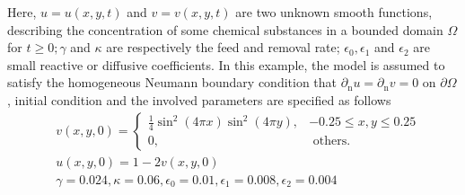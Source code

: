 Here, $u=u(x, y, t)$ and $v=v(x, y, t)$ are two unknown smooth functions, describing the concentration of some chemical substances in a bounded domain $\Omega$ for $t \geqslant 0 ; \gamma$ and $\kappa$ are respectively the feed and removal rate; $\epsilon_{0}, \epsilon_{1}$ and $\epsilon_{2}$ are small reactive or diffusive coefficients. In this example, the model is assumed to satisfy the homogeneous Neumann boundary condition that $\partial_{\mathrm{n}} u=\partial_{\mathrm{n}} v=0$ on $\partial \Omega$, initial condition and the involved parameters are specified as follows
$$
\begin{aligned}
&v(x, y, 0)=\left\{\begin{array}{cc}
\frac{1}{4} \sin ^{2}(4 \pi x) \sin ^{2}(4 \pi y), & -0.25 \leqslant x, y \leqslant 0.25 \\
0, & \text { others. }
\end{array}\right. \\
&u(x, y, 0)=1-2 v(x, y, 0) \\
&\gamma=0.024, \kappa=0.06, \epsilon_{0}=0.01, \epsilon_{1}=0.008, \epsilon_{2}=0.004
\end{aligned}
$$


